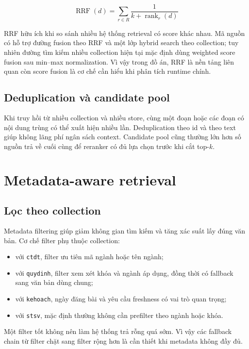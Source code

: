 \documentclass[../DoAn.tex]{subfiles}
\begin{document}
\begin{equation}
\operatorname{RRF}(d) =
\sum_{r \in R}
\frac{1}{k + \operatorname{rank}_r(d)}
\end{equation}

RRF hữu ích khi so sánh nhiều hệ thống retrieval có score khác nhau. Mã nguồn có
hỗ trợ đường fusion theo RRF và một lớp hybrid search theo collection; tuy nhiên
đường tìm kiếm nhiều collection hiện tại mặc định dùng weighted score fusion sau
min--max normalization. Vì vậy trong đồ án, RRF là nền tảng liên quan còn score
fusion là cơ chế cần hiểu khi phân tích runtime chính.

\subsection{Deduplication và candidate pool}

Khi truy hồi từ nhiều collection và nhiều store, cùng một đoạn hoặc các đoạn có
nội dung trùng có thể xuất hiện nhiều lần. Deduplication theo id và theo text giúp
không lãng phí ngân sách context. Candidate pool cũng thường lớn hơn số nguồn trả
về cuối cùng để reranker có đủ lựa chọn trước khi cắt top-$k$.

\section{Metadata-aware retrieval}

\subsection{Lọc theo collection}

Metadata filtering giúp giảm không gian tìm kiếm và tăng xác suất lấy đúng văn
bản. Cơ chế filter phụ thuộc collection:

\begin{itemize}
    \item với \texttt{ctdt}, filter ưu tiên mã ngành hoặc tên ngành;
    \item với \texttt{quydinh}, filter xem xét khóa và ngành áp dụng, đồng thời có
    fallback sang văn bản dùng chung;
    \item với \texttt{kehoach}, ngày đăng bài và yêu cầu freshness có vai trò
    quan trọng;
    \item với \texttt{stsv}, mặc định thường không cần prefilter theo ngành hoặc
    khóa.
\end{itemize}

Một filter tốt không nên làm hệ thống trả rỗng quá sớm. Vì vậy các fallback chain
từ filter chặt sang filter rộng hơn là cần thiết khi metadata không đầy đủ.
\end{document}
